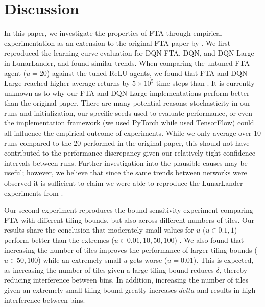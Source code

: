 \documentclass{article}
\begin{document}
\section{Discussion} \label{sec:discussion}
In this paper, we investigate the properties of FTA through empirical experimentation as an extension to the original FTA paper by \cite[]{pan2019fuzzy}.
We first reproduced the learning curve evaluation for DQN-FTA, DQN, and DQN-Large in LunarLander, and found similar trends. When comparing the untuned FTA agent ($u = 20$) against the tuned ReLU agents, we found that FTA and DQN-Large reached higher average returns by $5\times10^5$ time steps than \cite{pan2019fuzzy}. 
It is currently unknown as to why our FTA and DQN-Large implementations perform better than the original paper. 
There are many potential reasons: stochasticity in our runs and initialization, our specific seeds used to evaluate performance, or even the implementation framework (we used PyTorch while \cite{pan2019fuzzy} used TensorFlow) could all influence the empirical outcome of experiments. 
While we only average over 10 runs compared to the 20 performed in the original paper, this should not have contributed to the performance discrepancy given our relatively tight confidence intervals between runs. 
Further investigation into the plausible causes may be useful; however, we believe that since the same trends between networks were observed it is sufficient to claim we were able to reproduce the LunarLander experiments from \cite[]{pan2019fuzzy}.

Our second experiment reproduces the bound sensitivity experiment comparing FTA with different tiling bounds, but also across different numbers of tiles. 
Our results share the conclusion that moderately small values for $u$ ($u \in {0.1, 1}$) perform better than the extremes ($u \in {0.01, 10, 50, 100}$) \cite[]{pan2019fuzzy}. 
We also found that increasing the number of tiles improves the performance of larger tiling bounds ($u \in {50, 100}$) while an extremely small $u$ gets worse ($u = 0.01$). 
This is expected, as increasing the number of tiles given a large tiling bound reduces $\delta$, thereby reducing interference between bins. 
In addition, increasing the number of tiles given an extremely small tiling bound greatly increases $delta$ and results in high interference between bins.
\end{document}
